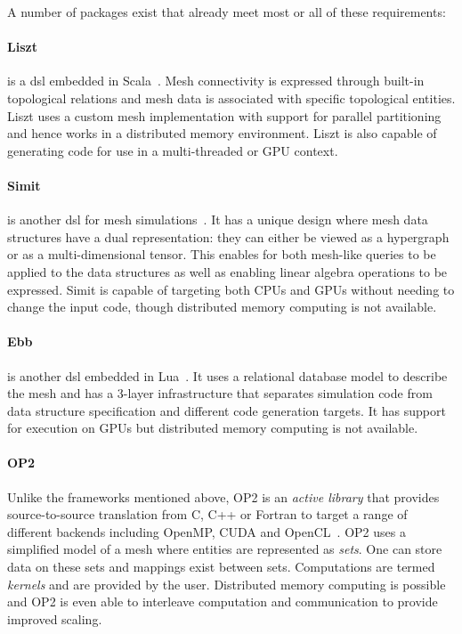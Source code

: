 \documentclass[thesis]{subfiles}
\begin{document}
A number of packages exist that already meet most or all of these requirements:

\paragraph{Liszt}{
  is a \gls{dsl} embedded in Scala~\cite{devitoLisztDomainSpecific2011}.
  Mesh connectivity is expressed through built-in topological relations and mesh data is associated with specific topological entities.
  Liszt uses a custom mesh implementation with support for parallel partitioning and hence works in a distributed memory environment.
  Liszt is also capable of generating code for use in a multi-threaded or GPU context.
}

\paragraph{Simit}{
  is another \gls{dsl} for mesh simulations~\cite{kjolstadSimitLanguagePhysical2016}.
  It has a unique design where mesh data structures have a dual representation: they can either be viewed as a hypergraph or as a multi-dimensional tensor.
  This enables for both mesh-like queries to be applied to the data structures as well as enabling linear algebra operations to be expressed.
  Simit is capable of targeting both CPUs and GPUs without needing to change the input code, though distributed memory computing is not available.
}

\paragraph{Ebb}{
  is another \gls{dsl} embedded in Lua~\cite{bernsteinEbbDSLPhysical2016}.
  It uses a relational database model to describe the mesh and has a 3-layer infrastructure that separates simulation code from data structure specification and different code generation targets.
  It has support for execution on GPUs but distributed memory computing is not available.
}

\paragraph{OP2}{
  Unlike the frameworks mentioned above, OP2 is an \textit{active library} that provides source-to-source translation from C, C++ or Fortran to target a range of different backends including OpenMP, CUDA and OpenCL~\cite{mudaligeOP2ActiveLibrary2012}.
  OP2 uses a simplified model of a mesh where entities are represented as \textit{sets}.
  One can store data on these sets and mappings exist between sets.
  Computations are termed \textit{kernels} and are provided by the user.
  Distributed memory computing is possible and OP2 is even able to interleave computation and communication to provide improved scaling.
}
\end{document}
